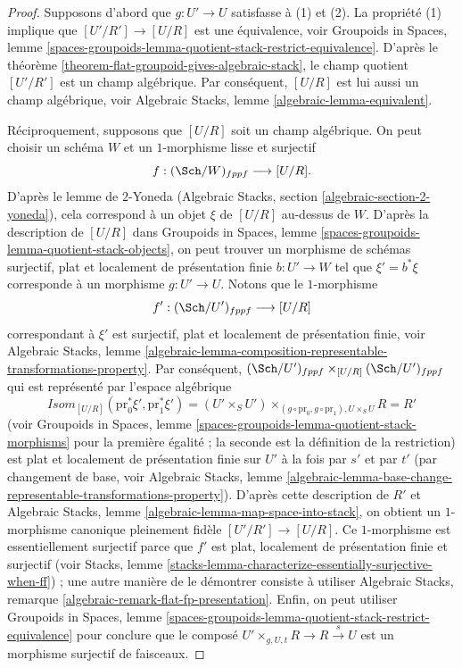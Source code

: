 \begin{proof}
Supposons d'abord que $g : U' \to U$ satisfasse à (1) et (2). La propriété (1)
implique que $[U'/R'] \to [U/R]$ est une équivalence, voir
Groupoids in Spaces,
lemme \ref{spaces-groupoids-lemma-quotient-stack-restrict-equivalence}.
D'après le
théorème \ref{theorem-flat-groupoid-gives-algebraic-stack},
le champ quotient $[U'/R']$ est un champ algébrique. Par conséquent,
$[U/R]$ est lui aussi un champ algébrique, voir
Algebraic Stacks, lemme \ref{algebraic-lemma-equivalent}.

\medskip\noindent
Réciproquement, supposons que $[U/R]$ soit un champ algébrique. On peut choisir un
schéma $W$ et un $1$-morphisme lisse et surjectif
$$
f : (\Sch/W)_{fppf} \longrightarrow [U/R].
$$
D'après le lemme de $2$-Yoneda
(Algebraic Stacks, section \ref{algebraic-section-2-yoneda}),
cela correspond à un objet $\xi$ de $[U/R]$ au-dessus de $W$.
D'après la description de $[U/R]$ dans
Groupoids in Spaces, lemme \ref{spaces-groupoids-lemma-quotient-stack-objects},
on peut trouver un morphisme de schémas surjectif, plat et localement de présentation finie
$b : U' \to W$ tel que $\xi' = b^*\xi$ corresponde à un morphisme
$g : U' \to U$. Notons que le $1$-morphisme
$$
f' : (\Sch/U')_{fppf} \longrightarrow [U/R]
$$
correspondant à $\xi'$ est surjectif, plat et localement de
présentation finie, voir
Algebraic Stacks, lemme
\ref{algebraic-lemma-composition-representable-transformations-property}.
Par conséquent,
$(\Sch/U')_{fppf} \times_{[U/R]} (\Sch/U')_{fppf}$
qui est représenté par l'espace algébrique
$$
\mathit{Isom}_{[U/R]}(\text{pr}_0^*\xi', \text{pr}_1^*\xi') =
(U' \times_S U')
\times_{(g \circ \text{pr}_0, g \circ \text{pr}_1), U \times_S U} R = R'
$$
(voir
Groupoids in Spaces, lemme
\ref{spaces-groupoids-lemma-quotient-stack-morphisms}
pour la première égalité ; la seconde est la définition de la restriction)
est plat et localement de présentation finie sur $U'$ à la fois par $s'$ et par $t'$
(par changement de base, voir
Algebraic Stacks, lemme
\ref{algebraic-lemma-base-change-representable-transformations-property}).
D'après cette description de $R'$ et
Algebraic Stacks, lemme \ref{algebraic-lemma-map-space-into-stack},
on obtient un $1$-morphisme canonique pleinement fidèle $[U'/R'] \to [U/R]$.
Ce $1$-morphisme est essentiellement surjectif parce que $f'$ est plat,
localement de présentation finie et surjectif (voir
Stacks, lemme \ref{stacks-lemma-characterize-essentially-surjective-when-ff}) ;
une autre manière de le démontrer consiste à utiliser
Algebraic Stacks, remarque
\ref{algebraic-remark-flat-fp-presentation}.
Enfin, on peut utiliser
Groupoids in Spaces, lemme
\ref{spaces-groupoids-lemma-quotient-stack-restrict-equivalence}
pour conclure que le composé
$U' \times_{g, U, t} R \to R \xrightarrow{s} U$ est un morphisme surjectif de faisceaux.
\end{proof}

